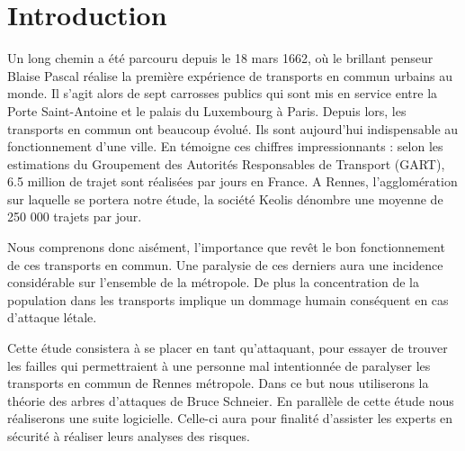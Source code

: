 \section{Introduction}
    Un long chemin a été parcouru depuis le 18 mars 1662, où le brillant penseur Blaise Pascal réalise la première expérience de transports en commun urbains au monde. Il s'agit alors de sept carrosses publics qui sont mis en service entre la Porte Saint-Antoine et le palais du Luxembourg à Paris. Depuis lors, les transports en commun ont beaucoup évolué. Ils sont aujourd'hui indispensable au fonctionnement d'une ville. En témoigne ces chiffres impressionnants : selon les estimations du Groupement des Autorités Responsables de Transport (GART), 6.5 million de trajet sont réalisées par jours en France. A Rennes, l'agglomération sur laquelle se portera notre étude, la société Keolis dénombre une moyenne de 250 000 trajets par jour. 

    Nous comprenons donc aisément, l'importance que revêt le bon fonctionnement de ces transports en commun. Une paralysie de ces derniers aura une incidence considérable sur l'ensemble de la métropole.  De plus la concentration de la population dans les transports implique un dommage humain conséquent en cas d'attaque létale.

    Cette étude consistera à se placer en tant qu'attaquant, pour essayer de trouver les failles qui permettraient à une personne mal intentionnée de paralyser les transports en commun de Rennes métropole. Dans ce but nous utiliserons la théorie des arbres d'attaques de Bruce Schneier. En parallèle de cette étude nous réaliserons une suite logicielle. Celle-ci aura pour finalité d'assister les experts en sécurité à réaliser leurs analyses des risques.
